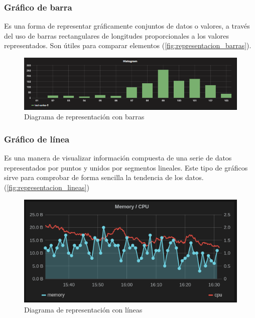 \subsubsection*{Gráfico de barra}
Es una forma de representar gráficamente conjuntos de datos o valores, a través
del uso de barras rectangulares de longitudes proporcionales a los valores
representados. Son útiles para comparar elementos
(\autoref{fig:representacion_barras}).

\begin{figure}
  \includegraphics[width=\linewidth]{src/images/01-capitulo-1/representacion_barras.png}
  \caption{Diagrama de representación con barras}
  \label{fig:representacion_barras}
\end{figure}

\subsubsection*{Gráfico de línea}
Es una manera de visualizar información compuesta de una serie de datos
representados por puntos y unidos por segmentos lineales. Este tipo de gráficos
sirve para comprobar de forma sencilla la tendencia de los
datos.(\autoref{fig:representacion_lineas})

\begin{figure}
  \includegraphics[width=\linewidth]{src/images/01-capitulo-1/representacion_lineas.png}
  \caption{Diagrama de representación con líneas}
  \label{fig:representacion_lineas}
\end{figure}

